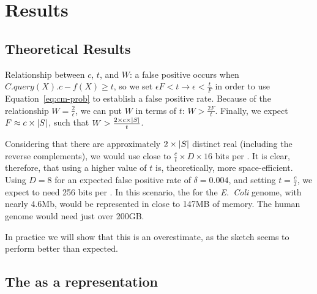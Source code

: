 \chapter{Results}

\section{Theoretical Results}


Relationship between $c$, $t$, and $W$: a false positive occurs when $C.\mathit{query}(X).c - f(X) \geq t$, so we set $\epsilon F < t \rightarrow \epsilon < \frac{t}{F}$ in order to use Equation~\ref{eq:cm-prob} to establish a false positive rate. Because of the relationship $W = \frac{2}{\epsilon}$, we can put $W$ in terms of $t$: $W > \frac{2F}{t}$. Finally, we expect $F \approx c \times |\strname{S}|$, such that $W > \frac{2 \times c \times |\strname{S}|}{t}$.

Considering that there are approximately $2 \times |\strname{S}|$ distinct real  (including the reverse complements), we would use close to  $\frac{c}{t} \times D \times 16$ bits per \kmer. It is clear, therefore, that using a higher value of $t$ is, theoretically, more space-efficient. Using $D = 8$ for an expected false positive rate of $\delta = 0.004$, and setting $t = \frac{c}{2}$, we expect to need 256 bits per \kmer. In this scenario, the \dBG for the \emph{E.~Coli} genome, with nearly 4.6Mb, would be represented in close to 147MB of memory. The human genome would need just over 200GB.

In practice we will show that this is an overestimate, as the sketch seems to perform better than expected.


\section{The \dBCM as a \dBG representation}

